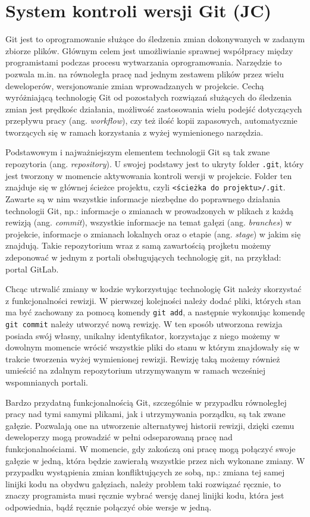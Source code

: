 \section{System kontroli wersji Git (JC)} %
Git jest to oprogramowanie służące do śledzenia zmian dokonywanych w zadanym zbiorze plików. Głównym celem jest umożliwianie sprawnej współpracy między programistami podczas procesu wytwarzania oprogramowania. Narzędzie to pozwala m.in. na równoległa pracę nad jednym zestawem plików przez wielu deweloperów, wersjonowanie zmian wprowadzanych w projekcie. Cechą wyróżniającą technologię Git od pozostałych rozwiązań służących do śledzenia zmian jest prędkośc działania, możliwość zastosowania wielu podejść dotyczących przepływu pracy (ang. \emph{workflow}), czy też ilość kopii zapasowych, automatycznie tworzących się w ramach korzystania z wyżej wymienionego narzędzia.

Podstawowym i najważniejszym elementem technologii Git są tak zwane repozytoria (ang. \emph{repository}). U swojej podstawy jest to ukryty folder \lstinline{.git}, który jest tworzony w momencie aktywowania kontroli wersji w projekcie. Folder ten znajduje się w głównej ścieżce projektu, czyli \lstinline{<ścieżka do projektu>/.git}. Zawarte są w nim wszystkie informacje niezbędne do poprawnego działania technologii Git, np.: informacje o zmianach w prowadzonych w plikach z każdą rewizją (ang. \emph{commit}), wszystkie informacje na temat gałęzi (ang. \emph{branches}) w projekcie, informacje o zmianach lokalnych oraz o etapie (ang. \emph{stage}) w jakim się znajdują. Takie repozytorium wraz z samą zawartością projketu możemy zdeponować w jednym z portali obsługujących technologię git, na przykład: portal GitLab.

Chcąc utrwalić zmiany w kodzie wykorzystując technologię Git należy skorzystać z funkcjonalności rewizji. W pierwszej kolejności należy dodać pliki, których stan ma być zachowany za pomocą komendy \lstinline{git add}, a następnie wykonując komendę \lstinline{git commit} należy utworzyć nową rewizję. W ten sposób utworzona rewizja posiada swój własny, unikalny identyfikator, korzystając z niego możemy w dowolnym momencie wrócić wszystkie pliki do stanu w którym znajdowały się w trakcie tworzenia wyżej wymienionej rewizji. Rewizję taką możemy również umieścić na zdalnym repozytorium utrzymywanym w ramach wcześniej wspomnianych portali.

Bardzo przydatną funkcjonalnością Git, szczególnie w przypadku równoległej pracy nad tymi samymi plikami, jak i utrzymywania porządku, są tak zwane gałęzie. Pozwalają one na utworzenie alternatywej historii rewizji, dzięki czemu deweloperzy mogą prowadzić w pełni odseparowaną pracę nad funkcjonalnościami. W momencie, gdy zakończą oni pracę mogą połączyć swoje gałęzie w jedną, która będzie zawierałą wszystkie przez nich wykonane zmiany. W przypadku wystąpienia zmian konfliktujących ze sobą, np.: zmiana tej samej linijki kodu na obydwu gałęziach, należy problem taki rozwiązać ręcznie, to znaczy programista musi ręcznie wybrać wersję danej linijki kodu, która jest odpowiednia, bądź ręcznie połączyć obie wersje w jedną.

